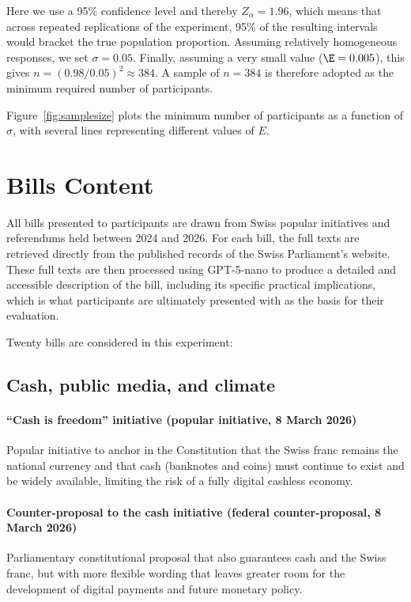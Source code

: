 \documentclass[11pt]{article}
\begin{document}
Here we use a 95\% confidence level and thereby $Z_\alpha = 1.96$, which means that across repeated replications of the experiment, 95\% of the resulting intervals would bracket the true population proportion. Assuming relatively homogeneous responses, we set $\sigma = 0.05$. Finally, assuming a very small value ($\E = 0.005$), this gives $n = (0.98/0.05)^2 \approx 384$. A sample of $n = 384$ is therefore adopted as the minimum required number of participants.

Figure~\ref{fig:samplesize} plots the minimum number of participants as a function of $\sigma$, with several lines representing different values of $E$.

\section{Bills Content}

All bills presented to participants are drawn from Swiss popular initiatives and referendums held between 2024 and 2026. For each bill, the full texts are retrieved directly from the published records of the Swiss Parliament's website. These full texts are then processed using GPT-5-nano to produce a detailed and accessible description of the bill, including its specific practical implications, which is what participants are ultimately presented with as the basis for their evaluation.

Twenty bills are considered in this experiment:

\subsection*{Cash, public media, and climate}

\paragraph{``Cash is freedom'' initiative (popular initiative, 8 March 2026)}
Popular initiative to anchor in the Constitution that the Swiss franc remains the national currency and that cash (banknotes and coins) must continue to exist and be widely available, limiting the risk of a fully digital cashless economy.

\paragraph{Counter-proposal to the cash initiative (federal counter-proposal, 8 March 2026)}
Parliamentary constitutional proposal that also guarantees cash and the Swiss franc, but with more flexible wording that leaves greater room for the development of digital payments and future monetary policy.
\end{document}
